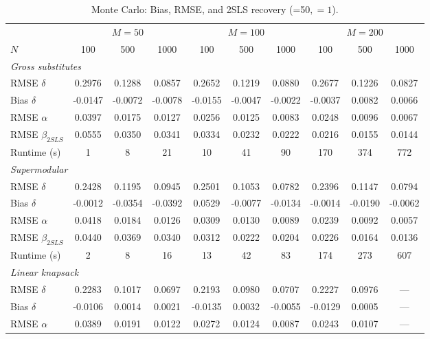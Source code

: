 \begin{table}[htbp]
\centering \footnotesize
\caption{Monte Carlo: Bias, RMSE, and 2SLS recovery (=50$, =1$).}
\label{tab:scenarios}
\begin{tabular}{l c c c c c c c c c}
\toprule
& \multicolumn{3}{c}{$M = 50$} & \multicolumn{3}{c}{$M = 100$} & \multicolumn{3}{c}{$M = 200$} \\
\cmidrule(lr){2-4} \cmidrule(lr){5-7} \cmidrule(lr){8-10}
$N$ & 100 & 500 & 1000 & 100 & 500 & 1000 & 100 & 500 & 1000 \\
\midrule
\multicolumn{10}{l}{\textit{Gross substitutes}} \\[2pt]
RMSE $\delta$ & 0.2976 & 0.1288 & 0.0857 & 0.2652 & 0.1219 & 0.0880 & 0.2677 & 0.1226 & 0.0827 \\
Bias $\delta$ & -0.0147 & -0.0072 & -0.0078 & -0.0155 & -0.0047 & -0.0022 & -0.0037 & 0.0082 & 0.0066 \\
RMSE $\alpha$ & 0.0397 & 0.0175 & 0.0127 & 0.0256 & 0.0125 & 0.0083 & 0.0248 & 0.0096 & 0.0067 \\
RMSE $\beta_{2SLS}$ & 0.0555 & 0.0350 & 0.0341 & 0.0334 & 0.0232 & 0.0222 & 0.0216 & 0.0155 & 0.0144 \\
Runtime (s) & 1 & 8 & 21 & 10 & 41 & 90 & 170 & 374 & 772 \\[4pt]
\multicolumn{10}{l}{\textit{Supermodular}} \\[2pt]
RMSE $\delta$ & 0.2428 & 0.1195 & 0.0945 & 0.2501 & 0.1053 & 0.0782 & 0.2396 & 0.1147 & 0.0794 \\
Bias $\delta$ & -0.0012 & -0.0354 & -0.0392 & 0.0529 & -0.0077 & -0.0134 & -0.0014 & -0.0190 & -0.0062 \\
RMSE $\alpha$ & 0.0418 & 0.0184 & 0.0126 & 0.0309 & 0.0130 & 0.0089 & 0.0239 & 0.0092 & 0.0057 \\
RMSE $\beta_{2SLS}$ & 0.0440 & 0.0369 & 0.0340 & 0.0312 & 0.0222 & 0.0204 & 0.0226 & 0.0164 & 0.0136 \\
Runtime (s) & 2 & 8 & 16 & 13 & 42 & 83 & 174 & 273 & 607 \\[4pt]
\multicolumn{10}{l}{\textit{Linear knapsack}} \\[2pt]
RMSE $\delta$ & 0.2283 & 0.1017 & 0.0697 & 0.2193 & 0.0980 & 0.0707 & 0.2227 & 0.0976 & --- \\
Bias $\delta$ & -0.0106 & 0.0014 & 0.0021 & -0.0135 & 0.0032 & -0.0055 & -0.0129 & 0.0005 & --- \\
RMSE $\alpha$ & 0.0389 & 0.0191 & 0.0122 & 0.0272 & 0.0124 & 0.0087 & 0.0243 & 0.0107 & --- \\

\end{tabular}
\end{table}
